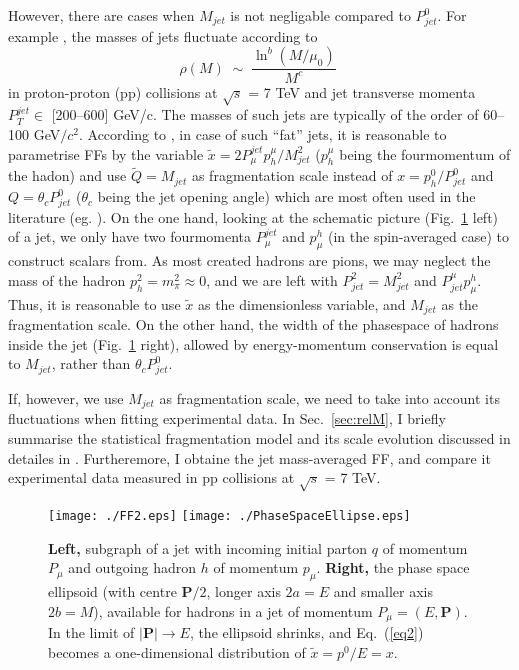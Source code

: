 \documentclass{appolb}
\newcommand{\be}{\begin{equation}}
\newcommand{\ee}[1]{\label{#1} \end{equation}}
\begin{document}
However, there are cases when $M_{jet}$ is not negligable compared to $P^0_{jet}$. For example \cite{bib:UKpp3D}, the masses of jets fluctuate according to 
\be
\rho(M) \;\sim\;  \frac{\ln^b(M/\mu_0)}{M^c} \;
\ee{eq1}
in proton-proton (pp) collisions at $\sqrt s$ = 7 TeV \cite{bib:atlasM} and jet transverse momenta $P^{jet}_T \in$ [200--600] GeV/c. The masses of such jets are typically of the order of 60--100 GeV$/c^2$. According to \cite{bib:UKep3D,bib:UKpp3D}, in case of such ``fat'' jets, it is reasonable to parametrise FFs by the variable $\tilde x = 2P^{jet}_\mu p_h^\mu/M_{jet}^2$ ($p_h^\mu$ being the fourmomentum of the hadon)  and use $\tilde Q = M_{jet}$ as fragmentation scale instead of $x = p_h^0/P_{jet}^0$ and $Q = \theta_c P_{jet}^0$ ($\theta_c$ being the jet opening angle) which are most often used in the literature (eg. \cite{bib:MLLA1,bib:MLLA2,bib:MLLA3,bib:MLLA4,bib:MLLA5,bib:MLLA6,bib:dEnterria1,bib:dEnterria2}). On the one hand, looking at the schematic picture (Fig.~\ref{fig:FFgraph} left) of a jet, we only have two fourmomenta $P^{jet}_\mu$ and $p^h_\mu$ (in the spin-averaged case) to construct scalars from. As most created hadrons are pions, we may neglect the mass of the hadron $p_h^2 = m^2_\pi \approx 0$, and we are left with $P_{jet}^2 = M_{jet}^2$ and $P_{jet}^\mu p^h_\mu$. Thus, it is reasonable to use $\tilde x$ as the dimensionless variable, and $M_{jet}$ as the fragmentation scale. On the other hand, the width of the pha\-se\-spa\-ce  of hadrons inside the jet (Fig.~\ref{fig:FFgraph} right), allowed by energy-momentum conservation is equal to $M_{jet}$, rather than $\theta_c P_{jet}^0$.

If, however, we use $M_{jet}$ as fragmentation scale, we need to take into account its fluctuations when fitting experimental data. In Sec.~\ref{sec:relM}, I briefly summarise the statistical fragmentation model and its scale evolution discussed in detailes in \cite{bib:UKep3D,bib:UKpp3D}. Furtheremore, I obtaine the jet mass-averaged FF, and compare it experimental data measured in pp collisions at $\sqrt{s}$ = 7 TeV.  

\begin{figure}%
\begin{center}
\texttt{[image: ./FF2.eps]}\hspace{10mm}
\texttt{[image: ./PhaseSpaceEllipse.eps]} %
\end{center}
\caption{ \label{fig:FFgraph}
\textbf{Left,} subgraph of a jet with incoming initial parton $q$ of momentum $P_\mu$ and outgoing hadron $h$ of momentum $p_{\mu}$. \textbf{Right,} the phase space ellipsoid (with centre $\mathbf{P}/2$, longer axis $2a = E$ and smaller axis $2b = M$), available for hadrons in a jet of momentum $P_{\mu} = (E,\mathbf{P})$. In the limit of $|\mathbf{P}|\rightarrow E$, the ellipsoid shrinks, and Eq.~(\ref{eq2}) becomes a one-dimensional distribution of $\tilde x = p^0/E=x$.}
\end{figure}
\end{document}
